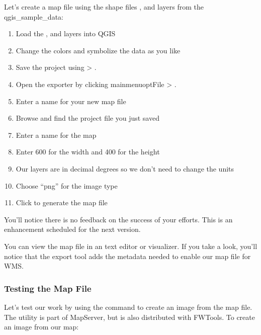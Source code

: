 Let's create a map file using the shape files ,  
and  layers from the qgis\_sample\_data:

\begin{enumerate}
  \item Load the ,  and  
  layers into QGIS
  \item Change the colors and symbolize the data as you like
  \item Save the project using  >
  .
  \item Open the exporter by clicking mainmenuopt{File} > .
  \item Enter a name for your new map file
  \item Browse and find the project file you just saved
  \item Enter a name for the map
  \item Enter 600 for the width and 400 for the height
  \item Our layers are in decimal degrees so we don't need to change the
    units
  \item Choose ``png'' for the image type
  \item Click  to generate the map file
\end{enumerate}



You'll notice there is no feedback on the success of your efforts. This
is an enhancement scheduled for the next version. 

You can view the map file in an text editor or visualizer. If you
take a look, you'll notice that the export tool adds the metadata needed
to enable our map file for WMS. 

\subsubsection{Testing the Map File}

Let's test our work by using the  command to create an image
from the map file. The   utility is part of MapServer,
but is also distributed with FWTools. To create an image from our map:

